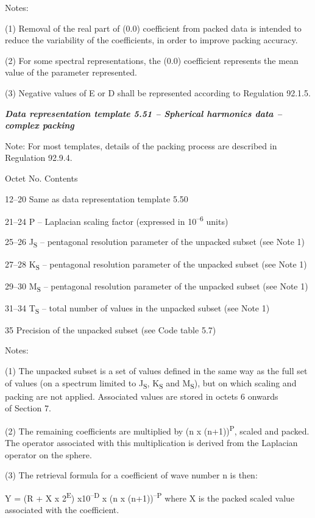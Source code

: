 Notes:

(1) Removal of the real part of (0.0) coefficient from packed data is intended to reduce the variability of the coefficients, in order to improve packing accuracy.

(2) For some spectral representations, the (0.0) coefficient represents the mean value of the parameter represented.

(3) Negative values of E or D shall be represented according to Regulation 92.1.5.

\emph{\textbf{Data representation template 5.51 -- Spherical harmonics data -- complex packing}}

Note: For most templates, details of the packing process are described in Regulation 92.9.4.

Octet No. Contents

12--20 Same as data representation template 5.50

21--24 P -- Laplacian scaling factor (expressed in 10\textsuperscript{--6} units)

25--26 J\textsubscript{S} -- pentagonal resolution parameter of the unpacked subset (see Note 1)

27--28 K\textsubscript{S} -- pentagonal resolution parameter of the unpacked subset (see Note 1)

29--30 M\textsubscript{S} -- pentagonal resolution parameter of the unpacked subset (see Note 1)

31--34 T\textsubscript{S} -- total number of values in the unpacked subset (see Note 1)

35 Precision of the unpacked subset (see Code table 5.7)

Notes:

(1) The unpacked subset is a set of values defined in the same way as the full set of values (on a spectrum limited to J\textsubscript{S}, K\textsubscript{S} and M\textsubscript{S}), but on which scaling and packing are not applied. Associated values are stored in octets 6 onwards\\
of Section 7.

(2) The remaining coefficients are multiplied by (n x (n+1))\textsuperscript{P}, scaled and packed. The operator associated with this multiplication is derived from the Laplacian operator on the sphere.

(3) The retrieval formula for a coefficient of wave number n is then:

Y = (R + X x 2\textsuperscript{E}) x10\textsuperscript{--D} x (n x (n+1))\textsuperscript{--P} where X is the packed scaled value associated with the coefficient.

